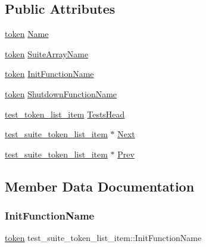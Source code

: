 \subsection*{Public Attributes}
\begin{DoxyCompactItemize}
\item 
\hyperlink{structtoken}{token} \hyperlink{structtest__suite__token__list__item_a63834f736499a8eb9a5be4ce658ad420}{Name}
\item 
\hyperlink{structtoken}{token} \hyperlink{structtest__suite__token__list__item_a33bab1f9cd9b0c869eadfcbde0320d86}{Suite\+Array\+Name}
\item 
\hyperlink{structtoken}{token} \hyperlink{structtest__suite__token__list__item_a3d7b2baf23150725e91f919067ec6d81}{Init\+Function\+Name}
\item 
\hyperlink{structtoken}{token} \hyperlink{structtest__suite__token__list__item_a0577805f0d8627a70a98882765c9a2b9}{Shutdown\+Function\+Name}
\item 
\hyperlink{structtest__token__list__item}{test\+\_\+token\+\_\+list\+\_\+item} \hyperlink{structtest__suite__token__list__item_a733adf7402d148f6d1d713f7ad08b835}{Tests\+Head}
\item 
\hyperlink{structtest__suite__token__list__item}{test\+\_\+suite\+\_\+token\+\_\+list\+\_\+item} $\ast$ \hyperlink{structtest__suite__token__list__item_aa9d98f0ebaaa60117452f83b01a5f875}{Next}
\item 
\hyperlink{structtest__suite__token__list__item}{test\+\_\+suite\+\_\+token\+\_\+list\+\_\+item} $\ast$ \hyperlink{structtest__suite__token__list__item_a0bbc26a13de896100669c60385883fd2}{Prev}
\end{DoxyCompactItemize}


\subsection{Member Data Documentation}
\mbox{\label{structtest__suite__token__list__item_a3d7b2baf23150725e91f919067ec6d81}} 
\subsubsection{\texorpdfstring{Init\+Function\+Name}{InitFunctionName}}
{\footnotesize\ttfamily \hyperlink{structtoken}{token} test\+\_\+suite\+\_\+token\+\_\+list\+\_\+item\+::\+Init\+Function\+Name}

